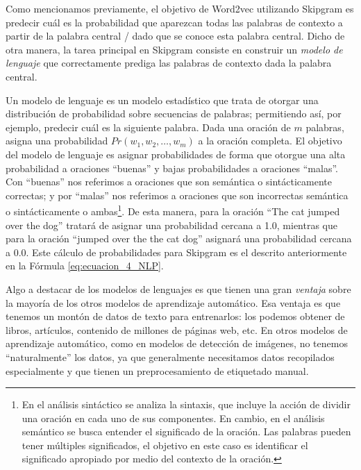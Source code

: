 \documentclass[12pt,a4paper]{article}
\begin{document}
\begin{sloppypar}
Como mencionamos previamente, el objetivo de Word2vec utilizando Skipgram es predecir cuál es la probabilidad que aparezcan todas las palabras de contexto a partir de la palabra central / dado que se conoce esta palabra central. Dicho de otra manera, la tarea principal en Skipgram consiste en construir un \textit{modelo de lenguaje} que correctamente prediga las palabras de contexto dada la palabra central. 

Un modelo de lenguaje es un modelo estadístico que trata de otorgar una distribución de probabilidad sobre secuencias de palabras; permitiendo así, por ejemplo, predecir cuál es la siguiente palabra. Dada una oración de $m$ palabras, asigna una probabilidad $Pr(w_1, w_2, …, w_m)$ a la oración completa. El objetivo del modelo de lenguaje es asignar probabilidades de forma que otorgue una alta probabilidad a oraciones “buenas” y bajas probabilidades a oraciones “malas”. Con “buenas” nos referimos a oraciones que son semántica o sintácticamente correctas; y por “malas” nos referimos a oraciones que son incorrectas semántica o sintácticamente o ambas\footnote{En el análisis sintáctico se analiza la sintaxis, que incluye la acción de dividir una oración en cada uno de sus componentes. En cambio, en el análisis semántico se busca entender el significado de la oración. Las palabras pueden tener múltiples significados, el objetivo en este caso es identificar el significado apropiado por medio del contexto de la oración.}. De esta manera, para la oración “The cat jumped over the dog” tratará de asignar una probabilidad cercana a 1.0, mientras que para la oración “jumped over the the cat dog” asignará una probabilidad cercana a 0.0\cite{NLP_26}. Este cálculo de probabilidades para Skipgram es el descrito anteriormente en la Fórmula \ref{eq:ecuacion_4_NLP}.

Algo a destacar de los modelos de lenguajes es que tienen una gran \textit{ventaja} sobre la mayoría de los otros modelos de aprendizaje automático. Esa ventaja es que tenemos un montón de datos de texto para entrenarlos: los podemos obtener de libros, artículos, contenido de millones de páginas web, etc. En otros modelos de aprendizaje automático, como en modelos de detección de imágenes, no tenemos “naturalmente” los datos, ya que generalmente necesitamos datos recopilados especialmente y que tienen un preprocesamiento de etiquetado manual. 


\end{sloppypar}
\end{document}
